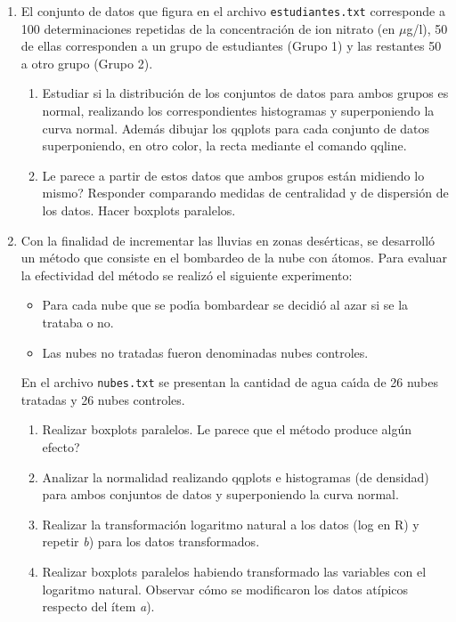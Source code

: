 \documentclass[12pt]{article}%
\def \sp {\textquestiondown}
\begin{document}
\begin{enumerate}
\item El conjunto de datos que figura en el archivo \texttt{estudiantes.txt} corresponde a 100 determinaciones repetidas de la concentraci\'{o}n de ion nitrato (en $\mu$g/l), 50 de ellas corresponden a un grupo de estudiantes (Grupo 1) y las restantes 50 a otro grupo (Grupo 2).
\begin{enumerate}
\item Estudiar si la distribuci\'on de los conjuntos de datos para ambos
grupos es normal, realizando los correspondientes histogramas y superponiendo
la curva normal. Adem\'as dibujar los qqplots para cada conjunto de datos superponiendo, en otro color, la recta mediante el comando \textsf{qqline}.
\item \sp Le parece a partir de estos datos que ambos grupos
est\'an midiendo lo mismo? Responder comparando medidas de centralidad y de
dispersi\'on de los datos. Hacer boxplots paralelos.
\end{enumerate}


\item Con la finalidad de incrementar las lluvias en zonas des\'{e}rticas,
se desarroll\'{o} un m\'{e}todo que consiste en el bombardeo de la nube con
\'{a}tomos. Para evaluar la efectividad del m\'{e}todo se realiz\'{o} el
siguiente experimento:
\begin{itemize}
\item Para cada nube que se pod\'{\i}a bombardear se decidi\'{o} al azar si se
la trataba o no.
\item Las nubes no tratadas fueron denominadas nubes controles.
\end{itemize}
En el archivo \texttt{nubes.txt} se presentan la cantidad de agua ca\'{\i}da de 26 nubes tratadas y 26
nubes controles.
\begin{enumerate}
\item Realizar boxplots paralelos. \sp Le parece que el
m\'etodo produce alg\'un efecto?
\item Analizar la normalidad realizando qqplots e histogramas (de densidad)
para ambos conjuntos de datos y superponiendo la curva normal. 
\item Realizar la transformaci\'on logaritmo natural a los datos (log en R) y repetir \textit{b}) para los datos transformados.
\item Realizar boxplots paralelos habiendo transformado las variables con el logaritmo natural. Observar c\'omo se modificaron los datos at\'ipicos respecto del \'item \textit{a}).
\end{enumerate}



\end{enumerate}
\end{document}
